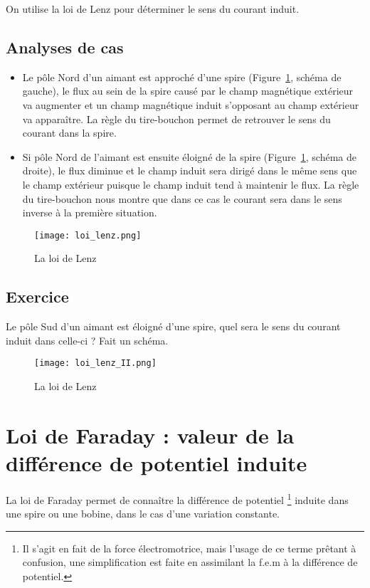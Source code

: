 On utilise la loi de Lenz pour déterminer le sens du courant induit.

\subsection{Analyses de cas}
\begin{itemize}
    \item Le pôle Nord d'un aimant est approché d'une spire (Figure~\ref{loi_lenz}, schéma de gauche), le flux au sein de la spire causé par le champ magnétique extérieur va augmenter et un champ magnétique induit s'opposant au champ extérieur va apparaître. La règle du tire-bouchon permet de retrouver le sens du courant dans la spire.
    \item Si pôle Nord de l'aimant est ensuite éloigné de la spire  (Figure~\ref{loi_lenz}, schéma de droite), le flux diminue et le champ induit sera dirigé dans le même sens que le champ extérieur puisque le champ induit tend à maintenir le flux. La règle du tire-bouchon nous montre que dans ce cas le courant sera dans le sens inverse à la première situation.
\end{itemize}

\newpage

\begin{figure}[h]
    \centering
    \texttt{[image: loi\_lenz.png]}
    \caption{La loi de Lenz}
    \label{loi_lenz}
\end{figure}

\newpage

\subsection{Exercice}

\begin{exercise}
    Le pôle Sud d'un aimant est éloigné d'une spire, quel sera le sens du courant induit dans celle-ci ? Fait un schéma.
\end{exercise}

\begin{figure}[h]
    \centering
    \texttt{[image: loi\_lenz\_II.png]}
    \caption{La loi de Lenz}
    \label{loi_lenz_2}
\end{figure}

\newpage

\section{Loi de Faraday : valeur de la différence de potentiel induite}
La loi de Faraday permet de connaître la différence de potentiel \footnote{Il s'agit en fait de la force électromotrice, mais l'usage de ce terme prêtant à confusion, une simplification est faite en assimilant la f.e.m à la différence de potentiel.} induite dans une spire ou une bobine, dans le cas d'une variation constante.

